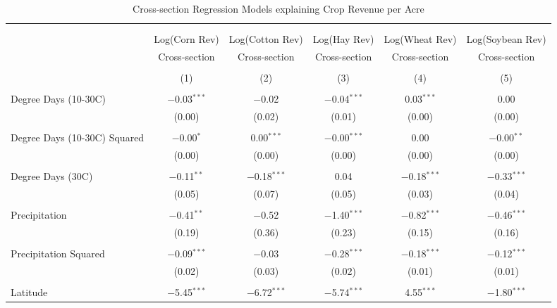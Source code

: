 \documentclass[10pt]{article}
\begin{document}
\newpage
\begin{table}[!htbp] \centering 
  \caption{Cross-section Regression Models explaining Crop Revenue per Acre} 
  \label{} 
\footnotesize 
\begin{tabular}{@{\extracolsep{5pt}}lccccc} 
\\[-1.8ex]\hline 
\hline \\[-1.8ex] 
\\[-1.8ex] & Log(Corn Rev) & Log(Cotton Rev) & Log(Hay Rev) & Log(Wheat Rev) & Log(Soybean Rev) \\ 
 & Cross-section & Cross-section & Cross-section & Cross-section & Cross-section \\ 
\\[-1.8ex] & (1) & (2) & (3) & (4) & (5)\\ 
\hline \\[-1.8ex] 
 Degree Days (10-30C) & $-$0.03$^{***}$ & $-$0.02 & $-$0.04$^{***}$ & 0.03$^{***}$ & 0.00 \\ 
  & (0.00) & (0.02) & (0.01) & (0.00) & (0.00) \\ 
  & & & & & \\ 
 Degree Days (10-30C) Squared & $-$0.00$^{*}$ & 0.00$^{***}$ & $-$0.00$^{***}$ & 0.00 & $-$0.00$^{**}$ \\ 
  & (0.00) & (0.00) & (0.00) & (0.00) & (0.00) \\ 
  & & & & & \\ 
 Degree Days (30C) & $-$0.11$^{**}$ & $-$0.18$^{***}$ & 0.04 & $-$0.18$^{***}$ & $-$0.33$^{***}$ \\ 
  & (0.05) & (0.07) & (0.05) & (0.03) & (0.04) \\ 
  & & & & & \\ 
 Precipitation & $-$0.41$^{**}$ & $-$0.52 & $-$1.40$^{***}$ & $-$0.82$^{***}$ & $-$0.46$^{***}$ \\ 
  & (0.19) & (0.36) & (0.23) & (0.15) & (0.16) \\ 
  & & & & & \\ 
 Precipitation Squared & $-$0.09$^{***}$ & $-$0.03 & $-$0.28$^{***}$ & $-$0.18$^{***}$ & $-$0.12$^{***}$ \\ 
  & (0.02) & (0.03) & (0.02) & (0.01) & (0.01) \\ 
  & & & & & \\ 
 Latitude & $-$5.45$^{***}$ & $-$6.72$^{***}$ & $-$5.74$^{***}$ & 4.55$^{***}$ & $-$1.80$^{***}$ \\ 

\end{tabular}
\end{table}
\end{document}
